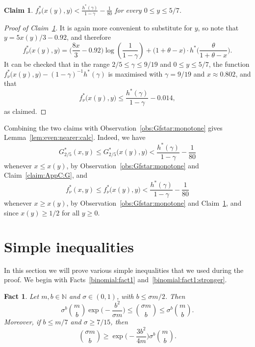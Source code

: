 \documentclass[12pt,reqno]{amsart}
\newtheorem{claim}[theorem]{Claim}
\newtheorem{fact}[theorem]{Fact}
\theoremstyle{definition}
\theoremstyle{remark}
\newenvironment{clmproof}[1]{\begin{proof}[Proof of Claim~\ref{#1}]\let\qednow\qedsymbol\renewcommand{\qedsymbol}{}}{\; \qednow \end{proof}}
\newcommand\N{\mathbb{N}}
\renewcommand{\le}{\leqslant}
\renewcommand{\ge}{\geqslant}
\def\N{\mathbb{N}}
\begin{document}
\begin{claim}\label{claim:AppC:fstar}
$f_\nu^*\big(x(y),y\big) < \displaystyle\frac{h^*(\gamma)}{1-\gamma} - \frac{1}{80}$ for every $0 \le y \le 5/7$.
\end{claim}
 
\begin{clmproof}{claim:AppC:fstar}
It is again more convenient to substitute for $y$, so note that $y = 5x(y)/3 - 0.92$, and therefore 
$$f_\nu^*\big(x(y),y\big) = \bigg( \frac{8x}{3} - 0.92 \bigg) \log \left(\frac{1}{1-\gamma}\right) + \big( 1 + \theta - x \big) \cdot h^*\bigg( \frac{\theta}{1 + \theta - x} \bigg).$$
It can be checked that in the range $2/5 \le \gamma \le 9/19$ and $0 \le y \le 5/7$, the function $f_\nu^*\big(x(y),y\big) - (1-\gamma)^{-1} h^*(\gamma)$ is maximised with $\gamma = 9/19$ and $x \approx 0.802$, and that
$$f_\nu^*\big(x(y),y\big) \le \frac{h^*(\gamma)}{1-\gamma} - 0.014,$$
as claimed.
\end{clmproof}

Combining the two claims with Observation~\ref{obs:Gfstar:monotone} gives Lemma~\ref{lem:even:nearer:calc}. Indeed, we have 
$$G_{2/5}^*(x,y) \le G_{2/5}^*\big( x(y),y \big) < \frac{h^*(\gamma)}{1-\gamma} - \frac{1}{80}$$ 
whenever $x \le x(y)$, by Observation~\ref{obs:Gfstar:monotone} and Claim~\ref{claim:AppC:G}, and 
$$f_\nu^*(x,y) \le f^*_\nu\big( x(y),y \big) < \frac{h^*(\gamma)}{1-\gamma} - \frac{1}{80}$$ 
whenever $x \ge x(y)$, by Observation~\ref{obs:Gfstar:monotone} and Claim~\ref{claim:AppC:fstar}, and since $x(y) \ge 1/2$ for all $y \ge 0$. 











\section{Simple inequalities}\label{app:simple}

In this section we will prove various simple inequalities that we used during the proof. We begin with Facts~\ref{binomial:fact1} and~\ref{binomial:fact1:stronger}. 

\begin{fact}
Let $m,b \in \N$ and $\sigma \in (0,1)$, with $b \le \sigma m / 2$. Then
\begin{equation}\label{eq:binomial:fact1}
\sigma^b {m \choose b} \exp\bigg( - \frac{b^2}{\sigma m} \bigg) \le {\sigma m \choose b} \le \sigma^b {m \choose b}.
\end{equation}
Moreover, if $b \le m/7$ and $\sigma \ge 7/15$, then
\begin{equation}\label{eq:binomial:fact1:stronger}
{\sigma m \choose b} \ge \exp\bigg( - \frac{3b^2}{4m} \bigg) \sigma^b {m \choose b}.
\end{equation} 
\end{fact}
\end{document}
